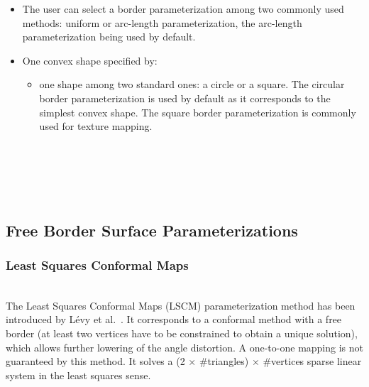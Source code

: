 \begin{itemize}

\item The user can select a border parameterization among
two commonly used methods: uniform or arc-length parameterization, the
arc-length parameterization being used by default.

\item One convex shape specified by:

    \begin{itemize}

    \item one shape among two standard ones: a circle or a square.
    The circular border parameterization is used by default as it
    corresponds to the simplest convex shape. The square border
    parameterization is commonly used for texture mapping.

    \end{itemize}

\end{itemize}

  \\
  \\
  \\
  \\


\subsection{Free Border Surface Parameterizations}

\subsubsection{Least Squares Conformal Maps}

  \\

The Least Squares Conformal Maps (LSCM) parameterization method has
been introduced by L\'evy et al.~\cite{cgal:lprm-lscm-02}. It
corresponds to a conformal method with a free border (at least two
vertices have to be constrained to obtain a unique solution), which
allows further lowering of the angle distortion. A one-to-one mapping
is not guaranteed by this method. It solves a (2 $\times$
\#triangles) $\times$ \#vertices sparse linear system in the least squares sense.

